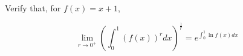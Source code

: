 Verify that, for $f(x) = x + 1$,

$$ \lim_{r \to 0^+} \left( \int_0^1 \left( f(x) \right)^r dx \right)^{\frac{1}{r}}
   = e^{\int_0^1 \ln f(x) dx} $$
